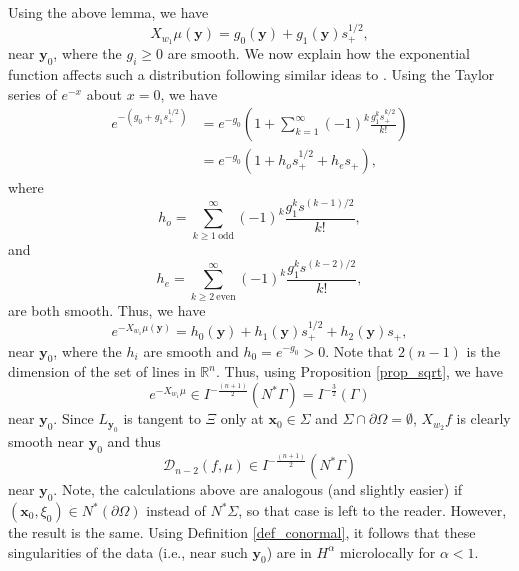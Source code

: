 \documentclass[a4paper,12pt]{amsart}
\numberwithin{equation}{section}
\theoremstyle{plain}
\numberwithin{theorem}{section}
\theoremstyle{definition}
\theoremstyle{remark}
\theoremstyle{remark}
\theoremstyle{remark}
\newcommand{\paren}[1]{\left(#1\right)}               %
\newcommand{\vx}{{\mathbf{x}}}
\newcommand{\vy}{{\mathbf{y}}}
\begin{document}
Using the above lemma, we have
\begin{equation}
X_{w_1}\mu(\vy) = g_0(\vy) + g_1(\vy)s^{1/2}_+,
\end{equation}
near $\vy_0$, where the $g_i \geq 0$ are smooth. We now explain how the exponential function affects such a distribution following similar ideas to \cite{katsevich2026analysis}. Using the Taylor series of $e^{-x}$ about $x = 0$, we have
\begin{equation}\label{taylor}
\begin{split}
 e^{-(g_0 + g_1s^{1/2}_+)} &= e^{-g_0}\paren{ 1 + \sum_{k=1}^\infty (-1)^k \frac{g_1^k s^{k/2}_+}{k!} }\\
&= e^{-g_0}\paren{ 1 +  h_o s^{1/2}_+ + h_e s_+  },
\end{split}
\end{equation}
where
$$h_o = \sum_{k\geq 1\ \text{odd}}^\infty (-1)^k \frac{g_1^k s^{(k-1)/2}}{k!},$$
and
$$h_e = \sum_{k\geq 2 \ \text{even}}^\infty (-1)^k \frac{g_1^k s^{(k-2)/2}}{k!},$$
are both smooth. Thus, we have
\begin{equation}
e^{-X_{w_1}\mu(\vy)} = h_0(\vy) + h_1(\vy)s^{1/2}_+ + h_2(\vy) s_+,
\end{equation}
near $\vy_0$, where the $h_i$ are smooth and $h_0 = e^{-g_0} > 0$. Note that $2(n-1)$ is the dimension of the set of lines in $\mathbb{R}^n$. %
Thus, using Proposition \ref{prop_sqrt}, we have
\begin{equation}
e^{-X_{w_1}\mu} \in I^{- \frac{(n+1)}{2}}(N^*\Gamma) = I^{- \frac{3}{2}}(\Gamma)
\end{equation}
near $\vy_0$. Since $L_{\vy_0}$ is tangent to $\Xi$ only at $\vx_0 \in \Sigma$ and $\Sigma \cap \partial \Omega = \emptyset$, $X_{w_2}f$ is clearly smooth near $\vy_0$ and thus
\begin{equation}
\mathcal{D}_{n-2}(f,\mu) \in  I^{- \frac{(n+1)}{2}}(N^*\Gamma)
\end{equation}
near $\vy_0$. Note, the calculations above are analogous (and slightly easier) if $(\vx_0,\xi_0) \in N^* (\partial\Omega)$ instead of $N^* \Sigma$, so that case is left to the reader. However, the result is the same. Using Definition \ref{def_conormal}, it follows that these singularities of the data (i.e., near such $\vy_0$) are in $H^{\alpha}$ microlocally for $\alpha < 1$.\\
\\
\end{document}
